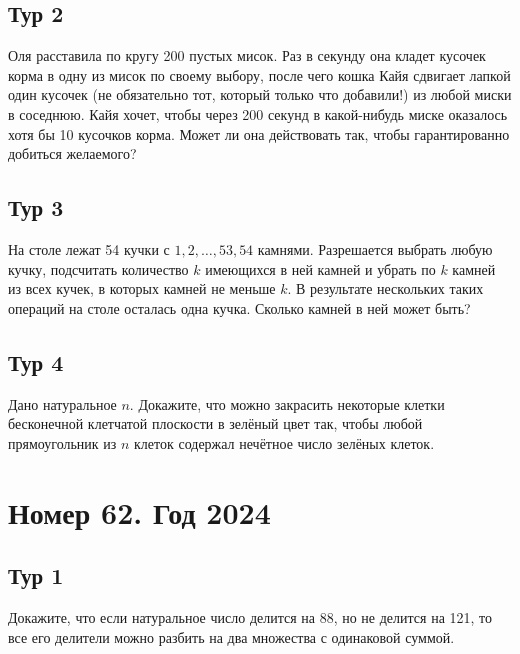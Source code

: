 \documentclass[11pt, a4paper]{problems_template}
\begin{document}
\section{Тур 2}

\begin{exercise}
Оля расставила по кругу 200 пустых мисок. Раз в секунду она кладет кусочек
корма в одну из мисок по своему выбору, после чего кошка Кайя сдвигает лапкой один кусочек (не обязательно тот, который только что добавили!) из любой миски в соседнюю. Кайя хочет, чтобы через 200 секунд в какой-нибудь миске оказалось хотя бы 10 кусочков корма. Может ли она действовать так, чтобы гарантированно добиться желаемого?
\end{exercise}

\section{Тур 3}

\begin{exercise}
На столе лежат 54 кучки с $1, 2, \dots, 53, 54$ камнями. Разрешается выбрать любую кучку, подсчитать количество $k$ имеющихся в ней камней и убрать по $k$ камней из всех кучек, в которых камней не меньше $k$. В результате нескольких таких операций на столе осталась одна кучка. Сколько камней в ней может быть?
\end{exercise}

\section{Тур 4}

\begin{exercise}
Дано натуральное $n$. Докажите, что можно закрасить некоторые клетки бесконечной клетчатой плоскости в зелёный цвет так, чтобы любой прямоугольник из $n$ клеток содержал нечётное число зелёных клеток.
\end{exercise}


\chapter{Номер 62. Год 2024}

\section{Тур 1}

\begin{exercise}
Докажите, что если натуральное число делится на 88, но не делится на 121, то все его делители можно разбить на два множества с одинаковой суммой.
\end{exercise}
\end{document}

